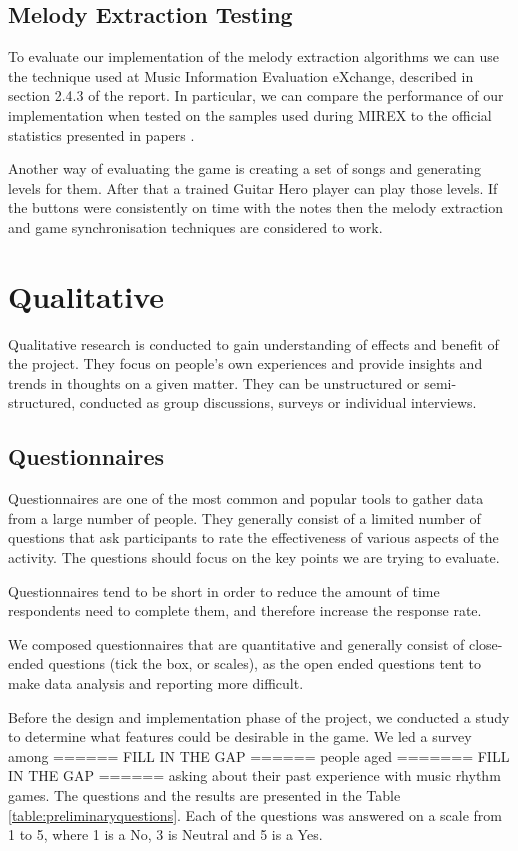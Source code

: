 \subsection{Melody Extraction Testing}
To evaluate our implementation of the melody extraction algorithms we can use the technique used at Music Information Evaluation eXchange, described in section 2.4.3 of the report. In particular, we can compare the performance of our implementation when tested on the samples used during MIREX to the official statistics presented in papers \cite{salamon, comparison}.

Another way of evaluating the game is creating a set of songs and generating levels for them. After that a trained Guitar Hero player can play those levels. If the buttons were consistently on time with the notes then the melody extraction and game synchronisation techniques are considered to work.

\section{Qualitative}
Qualitative research is conducted to gain understanding of effects and benefit of the project. They focus on people's own experiences and provide insights and trends in thoughts on a given matter. They can be unstructured or semi-structured, conducted as group discussions, surveys or individual interviews.



\subsection{Questionnaires}
Questionnaires are one of the most common and popular tools to gather data from a large number of people. They generally consist of a limited number of questions that ask participants to rate the effectiveness of various aspects of the activity. The questions should focus on the key points we are trying to evaluate. 

Questionnaires tend to be short in order to reduce the amount of time respondents need to complete them, and therefore increase the response rate. 

We composed questionnaires that are quantitative and generally consist of close-ended questions (tick the box, or scales), as the open ended questions tent to make data analysis and reporting more difficult.

Before the design and implementation phase of the project, we conducted a study to determine what features could be desirable in the game. We led a survey among ====== FILL IN THE GAP ====== people aged  ======= FILL IN THE GAP ====== asking about their past experience with music rhythm games. 
The questions and the results are presented in the Table  \ref{table:preliminaryquestions}. Each of the questions was answered on a scale from 1 to 5, where 1 is a No,  3 is Neutral and 5 is a Yes.


